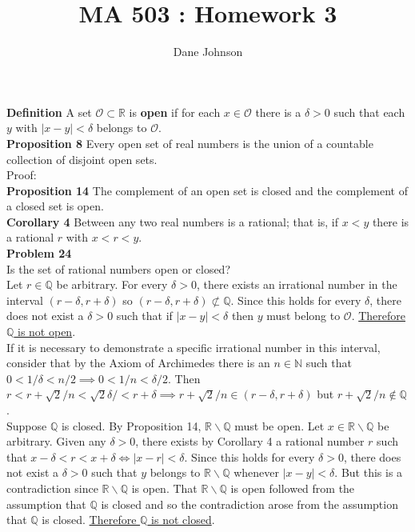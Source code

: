 \documentclass[a4paper]{article}
\title{MA 503 : Homework 3}
\author{Dane Johnson}
\begin{document}
\maketitle


{\bf Definition} A set $\mathcal{O} \subset \mathbb{R}$ is {\bf open} if for each $x \in \mathcal{O}$ there is a $\delta >0$ such that each $y$ with $|x-y|<\delta$ belongs to $\mathcal{O}$. \\

{\bf Proposition 8} Every open set of real numbers is the union of a countable collection of disjoint open sets. \\

Proof:\\



{\bf Proposition 14} The complement of an open set is closed and the complement of a closed set is open. \\

{\bf Corollary 4} Between any two real numbers is a rational; that is, if $x<y$ there is a rational $r$ with $x<r<y$. \\

{\bf Problem 24}\\
Is the set of rational numbers open or closed?\\

Let $r \in \mathbb{Q}$ be arbitrary. For every $\delta >0$, there exists an irrational number in the interval $(r-\delta, r+\delta)$ so $(r-\delta, r+\delta) \not\subset \mathbb{Q}$. Since this holds for every $\delta$, there does not exist a $\delta >0$ such that if $|x-y|<\delta$ then $y$ must belong to $\mathcal{O}$. \underline{Therefore $\mathbb{Q}$ is not open}.\\

If it is necessary to demonstrate a specific irrational number in this interval, consider that by the Axiom of Archimedes there is an $n \in \mathbb{N}$ such that $0<1/\delta < n/2 \implies 0<1/n<\delta/2$. Then $r<r + \sqrt{2}/n<\sqrt{2}\delta/ < r+\delta \implies r+\sqrt{2}/n \in (r-\delta, r+\delta)$ but $r+\sqrt{2}/n \not\in \mathbb{Q}$.\\

Suppose $\mathbb{Q}$ is closed. By Proposition 14, $\mathbb{R}\backslash \mathbb{Q}$ must be open. Let $x \in \mathbb{R}\backslash \mathbb{Q}$ be arbitrary. Given any $\delta >0$, there exists by Corollary 4 a rational number $r$ such that $x-\delta < r < x+\delta \iff |x-r| < \delta$. Since this holds for every $\delta >0$, there does not exist a $\delta>0$ such that $y$ belongs to $\mathbb{R}\backslash \mathbb{Q}$ whenever $|x-y| < \delta$. But this is a contradiction since $\mathbb{R}\backslash \mathbb{Q}$ is open. That $\mathbb{R}\backslash \mathbb{Q}$ is open followed from the assumption that $\mathbb{Q}$ is closed and so the contradiction arose from the assumption that $\mathbb{Q}$ is closed. \underline{Therefore $\mathbb{Q}$ is not closed}.\\
\end{document}
